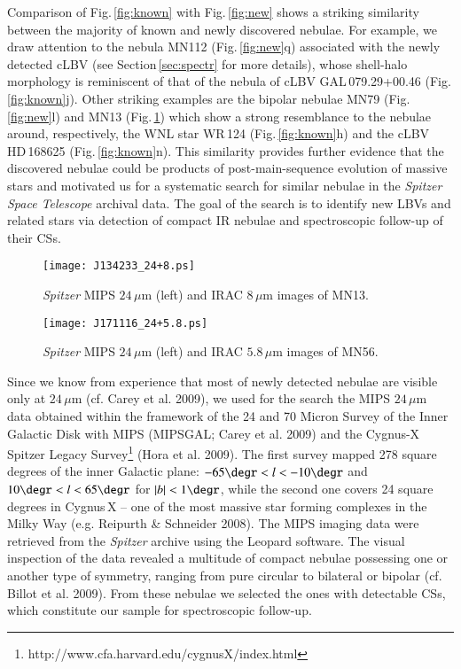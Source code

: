 \documentclass[useAMS]{mn2e}
\begin{document}
Comparison of Fig.\,\ref{fig:known} with Fig.\,\ref{fig:new} shows a
striking similarity between the majority of known and newly
discovered nebulae. For example, we draw attention to the nebula
MN112 (Fig.\,\ref{fig:new}q) associated with the newly detected cLBV
(see Section\,\ref{sec:spectr} for more details), whose shell-halo
morphology is reminiscent of that of the nebula of cLBV
GAL\,079.29+00.46 (Fig.\,\ref{fig:known}j). Other striking examples
are the bipolar nebulae MN79 (Fig.\,\ref{fig:new}l) and MN13
(Fig.\,\ref{fig:J134233(24+8)}) which show a strong resemblance to
the nebulae around, respectively, the WNL star WR\,124
(Fig.\,\ref{fig:known}h) and the cLBV HD\,168625
(Fig.\,\ref{fig:known}n). This similarity provides further evidence
that the discovered nebulae could be products of post-main-sequence
evolution of massive stars and motivated us for a systematic search
for similar nebulae in the {\it Spitzer Space Telescope} archival
data. The goal of the search is to identify new LBVs and related
stars via detection of compact IR nebulae and spectroscopic
follow-up of their CSs.
%
\begin{figure}
\begin{center}
\texttt{[image: J134233\_24+8.ps]}
\end{center}
\caption{{\it Spitzer} MIPS $24 \, \mu$m (left) and IRAC $8 \, \mu$m images of MN13.}
\label{fig:J134233(24+8)}
\end{figure}
%
%
\begin{figure}
\begin{center}
\texttt{[image: J171116\_24+5.8.ps]}
\end{center}
\caption{{\it Spitzer} MIPS $24 \, \mu$m (left) and IRAC $5.8 \, \mu$m images of MN56.}
\label{fig:J171116(24+5.8)}
\end{figure}
%

Since we know from experience that most of newly detected nebulae
are visible only at $24\,\mu$m (cf. Carey et al. 2009), we used for
the search the MIPS $24\,\mu$m data obtained within the framework of
the 24 and 70 Micron Survey of the Inner Galactic Disk with MIPS
(MIPSGAL; Carey et al. 2009) and the Cygnus-X Spitzer Legacy
Survey\footnote{http://www.cfa.harvard.edu/cygnusX/index.html} (Hora
et al. 2009). The first survey mapped 278 square degrees of the
inner Galactic plane: $-65\degr < l < -10\degr$ and $10\degr < l
<65\degr$ for $|b| < 1\degr$, while the second one covers 24 square
degrees in Cygnus\,X -- one of the most massive star forming
complexes in the Milky Way (e.g. Reipurth \& Schneider 2008). The
MIPS imaging data were retrieved from the {\it Spitzer} archive
using the Leopard software. The visual inspection of the data
revealed a multitude of compact nebulae possessing one or another
type of symmetry, ranging from pure circular to bilateral or bipolar
(cf. Billot et al. 2009). From these nebulae we selected the ones
with detectable CSs, which constitute our sample for spectroscopic
follow-up.
\end{document}
